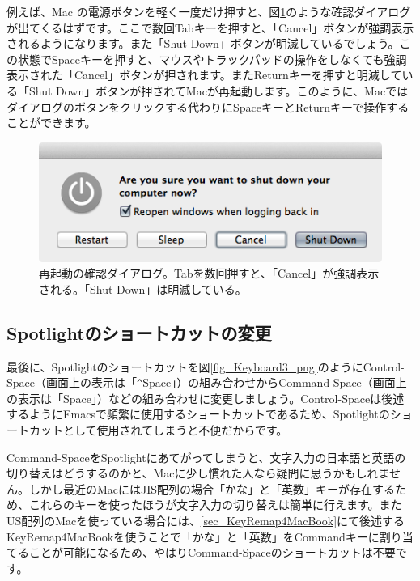 例えば、Mac の電源ボタンを軽く一度だけ押すと、図\ref{fig_reboot_png}のような確認ダイアログが出てくるはずです。ここで数回Tabキーを押すと、「Cancel」ボタンが強調表示されるようになります。また「Shut Down」ボタンが明滅しているでしょう。この状態でSpaceキーを押すと、マウスやトラックパッドの操作をしなくても強調表示された「Cancel」ボタンが押されます。またReturnキーを押すと明滅している「Shut Down」ボタンが押されてMacが再起動します。このように、Macではダイアログのボタンをクリックする代わりにSpaceキーとReturnキーで操作することができます。

\begin{figure}
  \centering
  \includegraphics[scale=0.35]{fig/reboot.png}
  \caption{再起動の確認ダイアログ。Tabを数回押すと、「Cancel」が強調表示される。「Shut Down」は明滅している。}
  \label{fig_reboot_png}
\end{figure}

\subsection{Spotlightのショートカットの変更}
最後に、Spotlightのショートカットを図\ref{fig_Keyboard3_png}のようにControl-Space（画面上の表示は「\verb|^|Space」）の組み合わせからCommand-Space（画面上の表示は「\cmd{}Space」）などの組み合わせに変更しましょう。Control-Spaceは後述するようにEmacsで頻繁に使用するショートカットであるため、Spotlightのショートカットとして使用されてしまうと不便だからです。

Command-SpaceをSpotlightにあてがってしまうと、文字入力の日本語と英語の切り替えはどうするのかと、Macに少し慣れた人なら疑問に思うかもしれません。しかし最近のMacにはJIS配列の場合「かな」と「英数」キーが存在するため、これらのキーを使ったほうが文字入力の切り替えは簡単に行えます。またUS配列のMacを使っている場合には、\ref{sec_KeyRemap4MacBook}にて後述するKeyRemap4MacBookを使うことで「かな」と「英数」をCommandキーに割り当てることが可能になるため、やはりCommand-Spaceのショートカットは不要です。

